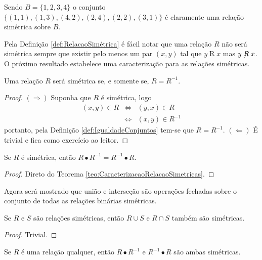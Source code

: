 \begin{example}
	Sendo $B = \{1, 2, 3, 4\}$ o conjunto $\{(1, 1), (1, 3), (4, 2), (2, 4), (2, 2), (3, 1)\}$ é claramente uma relação simétrica sobre $B$.
\end{example}

Pela Definição \ref{def:RelacaoSimétrica} é fácil notar que uma relação $R$ não será simétrica sempre que existir pelo menos um par $(x, y)$ tal que $y \mathrel{R} x$ mas $y \centernot{R} x$. O próximo resultado estabelece uma caracterização para as relações simétricas.

\begin{theorem}\label{teo:CaracterizacaoRelacaoSimetricas}
	Uma relação $R$ será simétrica se, e somente se, $R = R^{-1}$.
\end{theorem}

\begin{proof}
	$(\Rightarrow)$ Suponha que $R$ é simétrica, logo
	\begin{eqnarray*}
		(x, y) \in R & \Longleftrightarrow & (y, x) \in R\\
		& \Longleftrightarrow & (x, y) \in R^{-1}
	\end{eqnarray*}
	portanto, pela Definição \ref{def:IgualdadeConjuntos} tem-se que $R = R^{-1}$. $(\Leftarrow)$ É trivial e fica como exercício ao leitor.
\end{proof}


\begin{corollary}
	Se $R$ é simétrica, então $R \bullet R^{-1} = R^{-1} \bullet R$.
\end{corollary}

\begin{proof}
	Direto do Teorema \ref{teo:CaracterizacaoRelacaoSimetricas}.
\end{proof}

Agora será mostrado que união e interseção são operações fechadas sobre o conjunto de todas as relações binárias simétricas.

\begin{theorem}\label{teo:FechamentoSimetricas}
	Se $R$ e $S$ são relações simétricas, então $R \cup S$ e $R \cap S$ também são simétricas.
\end{theorem}

\begin{proof}
	Trivial.
\end{proof}

\begin{theorem}
	Se $R$ é uma relação qualquer, então $R \bullet R^{-1}$ e  $R^{-1} \bullet R$ são ambas simétricas.
\end{theorem}

